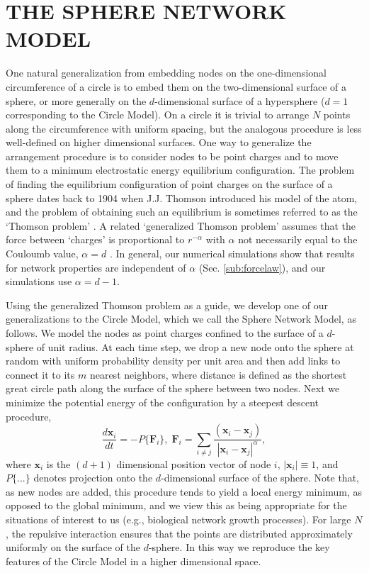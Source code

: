 \documentclass[aps,pre,manuscript,superscriptaddress,amsmath,amssymb,nofootinbib]{revtex4-1}
\begin{document}
\section{THE SPHERE NETWORK MODEL}
One natural generalization from embedding nodes on the one-dimensional circumference of a circle is to embed them on the two-dimensional surface of a sphere, or more generally on the $d$-dimensional surface of a hypersphere ($d=1$ corresponding to the Circle Model).
On a circle it is trivial to arrange $N$ points along the circumference with uniform spacing, but the analogous procedure is less well-defined on higher dimensional surfaces.
One way to generalize the arrangement procedure is to consider nodes to be point charges and to move them to a minimum electrostatic energy equilibrium configuration. 
The problem of finding the equilibrium configuration of point charges on the surface of a sphere dates back to 1904 when J.J. Thomson introduced his model of the atom, and the problem of obtaining such an equilibrium is sometimes referred to as the `Thomson problem' \cite{thomson1904}. 
A related `generalized Thomson problem' assumes that the force between `charges' is proportional to $r^{-\alpha}$ with $\alpha$ not necessarily equal to the Couloumb value, $\alpha = d$ \cite{nelson}.
In general, our numerical simulations show that results for network properties are independent of $\alpha$ (Sec. \ref{sub:forcelaw}), and our simulations use $\alpha = d-1$.

Using the generalized Thomson problem as a guide, we develop one of our generalizations to the Circle Model, which we call the Sphere Network Model, as follows.
We model the nodes as point charges confined to the surface of a $d$-sphere of unit radius.
At each time step, we drop a new node onto the sphere at random with uniform probability density per unit area and then add links to connect it to its $m$ nearest neighbors, where distance is defined as the shortest great circle path along the surface of the sphere between two nodes.
Next we minimize the potential energy of the configuration by a steepest descent procedure, 
\begin{equation}
\frac{d\textbf{x}_i}{dt} = -P\{\textbf{F}_i\},\;
\textbf{F}_i = \sum_{i \neq j} \frac{(\textbf{x}_i - \textbf{x}_j)}{|\textbf{x}_i - \textbf{x}_j|^{\alpha}},
\end{equation}
where $\textbf{x}_i$ is the $(d+1)$ dimensional position vector of node $i$, $|\textbf{x}_i| \equiv 1$, and $P\{...\}$ denotes projection onto the $d$-dimensional surface of the sphere.
Note that, as new nodes are added, this procedure tends to yield a local energy minimum, as opposed to the global minimum, and we view this as being appropriate for the situations of interest to us (e.g., biological network growth processes).
For large $N$, the repulsive interaction ensures that the points are distributed approximately uniformly on the surface of the $d$-sphere.
In this way we reproduce the key features of the Circle Model in a higher dimensional space.
\end{document}
